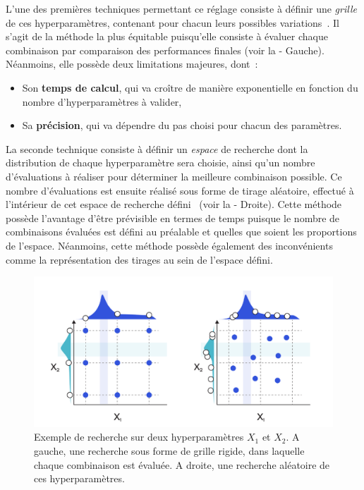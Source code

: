 L’une des premières techniques permettant ce réglage consiste à définir une \textit{grille} de ces hyperparamètres, contenant pour chacun leurs possibles variations~\cite{Liu2006}. Il s'agit de la méthode la plus équitable puisqu'elle consiste à évaluer chaque combinaison par comparaison des performances finales (voir la  - Gauche). Néanmoins, elle possède deux limitations majeures, dont~:
\begin{itemize}
    \item Son \textbf{temps de calcul}, qui va croître de manière exponentielle en fonction du nombre d'hyperparamètres à valider,
    \item Sa \textbf{précision}, qui va dépendre du pas choisi pour chacun des paramètres.
\end{itemize}\par

La seconde technique consiste à définir un \textit{espace} de recherche dont la distribution de chaque hyperparamètre sera choisie, ainsi qu'un nombre d'évaluations à réaliser pour déterminer la meilleure combinaison possible. Ce nombre d'évaluations est ensuite réalisé sous forme de tirage aléatoire, effectué à l'intérieur de cet espace de recherche défini~\cite{bergstra2012} (voir la  - Droite). Cette méthode possède l'avantage d'être prévisible en termes de temps puisque le nombre de combinaisons évaluées est défini au préalable et quelles que soient les proportions de l'espace. Néanmoins, cette méthode possède également des inconvénients comme la représentation des tirages au sein de l'espace défini.

\begin{figure}[H]
    \centering
    \includegraphics[width=\linewidth]{contents/chapter_3/resources/example_hyperparameter_selection.pdf}
    \caption{Exemple de recherche sur deux hyperparamètres $X_1$ et $X_2$. A gauche, une recherche sous forme de grille rigide, dans laquelle chaque combinaison est évaluée. A droite, une recherche aléatoire de ces hyperparamètres.}
    \label{fig:example_hyperparameter_selection}
\end{figure}

